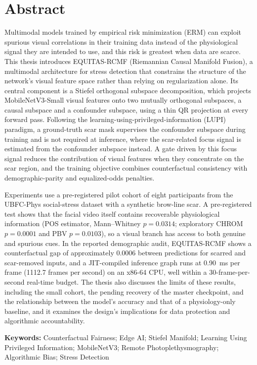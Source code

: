\section*{Abstract}

Multimodal models trained by empirical risk minimization (ERM) can exploit spurious visual correlations in their training data instead of the physiological signal they are intended to use, and this risk is greatest when data are scarce. This thesis introduces EQUITAS-RCMF (Riemannian Causal Manifold Fusion), a multimodal architecture for stress detection that constrains the structure of the network's visual feature space rather than relying on regularization alone. Its central component is a Stiefel orthogonal subspace decomposition, which projects MobileNetV3-Small visual features onto two mutually orthogonal subspaces, a causal subspace and a confounder subspace, using a thin QR projection at every forward pass. Following the learning-using-privileged-information (LUPI) paradigm, a ground-truth scar mask supervises the confounder subspace during training and is not required at inference, where the scar-related focus signal is estimated from the confounder subspace instead. A gate driven by this focus signal reduces the contribution of visual features when they concentrate on the scar region, and the training objective combines counterfactual consistency with demographic-parity and equalized-odds penalties.

Experiments use a pre-registered pilot cohort of eight participants from the UBFC-Phys social-stress dataset with a synthetic brow-line scar. A pre-registered test shows that the facial video itself contains recoverable physiological information (POS estimator, Mann--Whitney $p = 0.0314$; exploratory CHROM $p = 0.0001$ and PBV $p = 0.0103$), so a visual branch has access to both genuine and spurious cues. In the reported demographic audit, EQUITAS-RCMF shows a counterfactual gap of approximately $0.0006$ between predictions for scarred and scar-removed inputs, and a JIT-compiled inference graph runs at 0.90~ms per frame (1112.7 frames per second) on an x86-64 CPU, well within a 30-frame-per-second real-time budget. The thesis also discusses the limits of these results, including the small cohort, the pending recovery of the master checkpoint, and the relationship between the model's accuracy and that of a physiology-only baseline, and it examines the design's implications for data protection and algorithmic accountability.

\vspace{0.75cm}

\noindent\textbf{Keywords:} Counterfactual Fairness; Edge AI; Stiefel Manifold; Learning Using Privileged Information; MobileNetV3; Remote Photoplethysmography; Algorithmic Bias; Stress Detection
